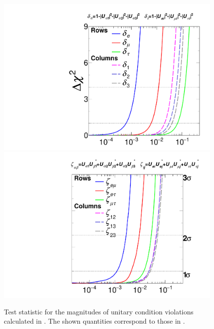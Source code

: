 \begin{figure}
    \centering
    \includegraphics[width=0.49\linewidth]{figures/theory/Norm.pdf}
    \includegraphics[width=0.49\linewidth]{figures/theory/Clos_temp.pdf}
    \caption{Test statistic for the magnitudes of unitary condition violations calculated in \cite{global_unitarity_Hu}. The shown quantities correspond to those in .\label{fig:nonunitary-global-fits}}
\end{figure}